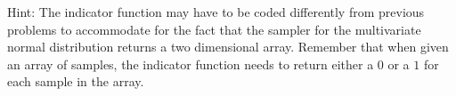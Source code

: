 Hint: The indicator function may have to be coded differently from previous problems to accommodate for the fact that the sampler for the multivariate normal distribution returns a two dimensional array.
Remember that when given an array of samples, the indicator function needs to return either a $0$ or a $1$ for each sample in the array.
